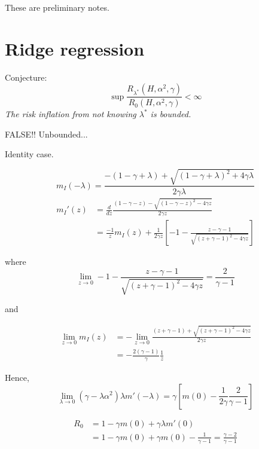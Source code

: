\documentclass[12pt]{article}
\begin{document}
\maketitle

\newcommand{\tr}{\text{tr}}
\newcommand{\E}{\textbf{E}}
\newcommand{\diag}{\text{diag}}
\newcommand{\argmax}{\text{argmax}}
\newcommand{\Cov}{\text{Cov}}
\newcommand{\Var}{\text{Var}}
\newcommand{\argmin}{\text{argmin}}
\newcommand{\Vol}{\text{Vol}}
\newcommand{\comm}[1]{}

These are preliminary notes.

\section{Ridge regression}

Conjecture: 
\[
\sup \frac{R_{\lambda^*}(H, \alpha^2, \gamma)}{R_0(H, \alpha^2, \gamma)} < \infty
\]
\emph{The risk inflation from not knowing $\lambda^*$ is bounded.}

FALSE!! Unbounded...

Identity case.

\[
m_I(-\lambda) = \frac{-(1 -\gamma + \lambda) + \sqrt{(1-\gamma + \lambda)^2 + 4\gamma \lambda}}{2\gamma \lambda}
\]
\begin{align*}
m_I'(z) &= \frac{d}{dz} \frac{(1-\gamma-z) - \sqrt{(1-\gamma - z)^2 -4\gamma z}}{2 \gamma z}
\\&= \frac{-1}{z}m_I(z) +
\frac{1}{2\gamma z}\left[-1 - \frac{z-\gamma-1}{\sqrt{(z+\gamma - 1)^2 -4\gamma z}}
\right]
\end{align*}

where 
\[
\lim_{z \to 0}-1 - \frac{z-\gamma-1}{\sqrt{(z+\gamma - 1)^2 -4\gamma z}} = \frac{2}{\gamma - 1}
\]

and

\begin{align*}
\lim_{z\to 0} m_I(z) &=
-\lim_{z\to 0}
\frac{(z+\gamma-1) + \sqrt{(z+\gamma - 1)^2 -4\gamma z}}{2\gamma z} 
\\&= -\frac{2(\gamma - 1)}{\gamma}\frac{1}{z}
\end{align*}



Hence,
\[
\lim_{\lambda \to 0} (\gamma - \lambda\alpha^2)\lambda m'(-\lambda) = 
\gamma \left[m(0) - \frac{1}{2\gamma}\frac{2}{\gamma-1}\right]
\]

\begin{align*}
R_0 &= 1-\gamma m(0) + \gamma \lambda m'(0)
\\&= 1 - \gamma m(0) + \gamma m(0) - \frac{1}{\gamma - 1}  = \frac{\gamma - 2}{\gamma - 1}
\end{align*}
\end{document}
